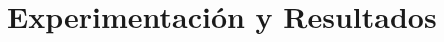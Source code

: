\documentclass[xcolor=dvipsnames,table]{beamer}
\begin{document}
\section{Experimentación y Resultados}

\end{document}
